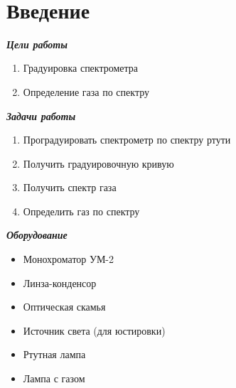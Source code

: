 \documentclass[a4paper]{article}
\begin{document}
	
	\begin{center}
		
		\  \vskip 10cm
		
		\fontsize{20}{16pt} \selectfont {Лабораторная работа № 6: Градуировка спектрометра}
		
		\vskip 0.5mm
		
		\fontsize{14}{16pt} 
		
		\thispagestyle{empty}
		\newpage
		
	\end{center}

	\section*{Введение}
	
		\begin{flushleft}
		
			\fontsize{14}{0pt} \selectfont \textbf{\textit{Цели работы}}
			
			\begin{enumerate}
					
					\item Градуировка спектрометра
					\item Определение газа по спектру
	
			\end{enumerate}
		
			\fontsize{14}{0pt} \selectfont \textbf{\textit{Задачи работы}}
			
			\begin{enumerate}
				
				\item Проградуировать спектрометр по спектру ртути
				\item Получить градуировочную кривую
				\item Получить спектр газа
				\item Определить газ по спектру
				
			\end{enumerate}
		
			\fontsize{14}{0pt} \selectfont \textbf{\textit{Оборудование}}
			
			\begin{itemize}
				
				\item Монохроматор УМ-2
				\item Линза-конденсор
				\item Оптическая скамья
				\item Источник света (для юстировки)
				\item Ртутная лампа
				\item Лампа с газом
				
			\end{itemize}
		
		\end{flushleft}
	
\end{document}
